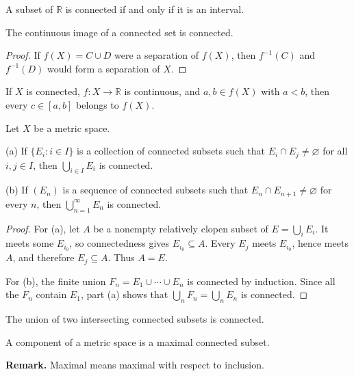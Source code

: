 \begin{thm}
A subset of $\mathbb{R}$ is connected if and only if it is an interval.
\end{thm}

\begin{thm}
The continuous image of a connected set is connected.
\end{thm}

\begin{proof}
If $f(X)=C\cup D$ were a separation of $f(X)$, then
$f^{-1}(C)$ and $f^{-1}(D)$ would form a separation of $X$.
\end{proof}

\begin{cor}
If $X$ is connected, $f:X\to\mathbb{R}$ is continuous, and
$a,b\in f(X)$ with $a<b$, then every $c\in[a,b]$ belongs to $f(X)$.
\end{cor}

\begin{thm}
Let $X$ be a metric space.

(a) If $\{E_i:i\in I\}$ is a collection of connected subsets such that
$E_i\cap E_j\neq\varnothing$ for all $i,j\in I$, then
$\bigcup_{i\in I}E_i$ is connected.

(b) If $(E_n)$ is a sequence of connected subsets such that
$E_n\cap E_{n+1}\neq\varnothing$ for every $n$, then
$\bigcup_{n=1}^\infty E_n$ is connected.
\end{thm}

\begin{proof}
For (a), let $A$ be a nonempty relatively clopen subset of
$E=\bigcup_iE_i$. It meets some $E_{i_0}$, so connectedness gives
$E_{i_0}\subseteq A$. Every $E_j$ meets $E_{i_0}$, hence meets $A$, and
therefore $E_j\subseteq A$. Thus $A=E$.

For (b), the finite union $F_n=E_1\cup\cdots\cup E_n$ is connected by
induction. Since all the $F_n$ contain $E_1$, part (a) shows that
$\bigcup_nF_n=\bigcup_nE_n$ is connected.
\end{proof}

\begin{cor}
The union of two intersecting connected subsets is connected.
\end{cor}

\begin{de}
A component of a metric space is a maximal connected subset.
\end{de}

\textbf{Remark.} Maximal means maximal with respect to inclusion.

